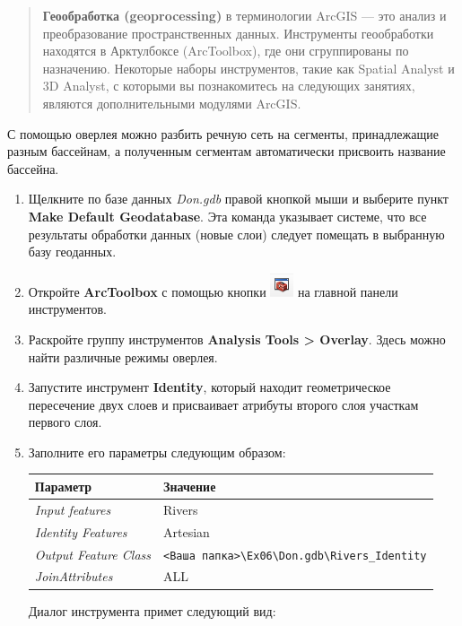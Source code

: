 \documentclass[12pt,]{book}
\begin{document}
\begin{quote}
\textbf{Геообработка (geoprocessing)} в терминологии ArcGIS --- это анализ и преобразование пространственных данных. Инструменты геообработки находятся в Арктулбоксе (ArcToolbox), где они сгруппированы по назначению. Некоторые наборы инструментов, такие как Spatial Analyst и 3D Analyst, с которыми вы познакомитесь на следующих занятиях, являются дополнительными модулями ArcGIS.
\end{quote}

С помощью оверлея можно разбить речную сеть на сегменты, принадлежащие разным бассейнам, а полученным сегментам автоматически присвоить название бассейна.

\begin{enumerate}
\def\labelenumi{\arabic{enumi}.}
\item
  Щелкните по базе данных \emph{Don.gdb} правой кнопкой мыши и выберите пункт \textbf{Make Default Geodatabase}. Эта команда указывает системе, что все результаты обработки данных (новые слои) следует помещать в выбранную базу геоданных.
\item
  Откройте \textbf{ArcToolbox} с помощью кнопки \includegraphics{images/Ex06/image19.png} на главной панели инструментов.
\item
  Раскройте группу инструментов \textbf{Analysis Tools \textgreater{} Overlay}. Здесь можно найти различные режимы оверлея.
\item
  Запустите инструмент \textbf{Identity}, который находит геометрическое пересечение двух слоев и присваивает атрибуты второго слоя участкам первого слоя.
\item
  Заполните его параметры следующим образом:

  \begin{longtable}[]{@{}ll@{}}
  \toprule
  Параметр & Значение\tabularnewline
  \midrule
  \endhead
  \emph{Input features} & Rivers\tabularnewline
  \emph{Identity Features} & Artesian\tabularnewline
  \emph{Output Feature Class} & \texttt{\textless{}Ваша\ папка\textgreater{}\textbackslash{}Ex06\textbackslash{}Don.gdb\textbackslash{}Rivers\_Identity}\tabularnewline
  \emph{JoinAttributes} & ALL\tabularnewline
  \bottomrule
  \end{longtable}

  Диалог инструмента примет следующий вид:


\end{enumerate}
\end{document}
